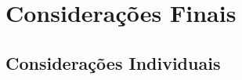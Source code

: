 \chapter[Considerações Finais]{Considerações Finais}
\label{chap:feedback}
	\section[Considerações Individuais]{Considerações Individuais}
	\label{sec:feedback_indv}
		